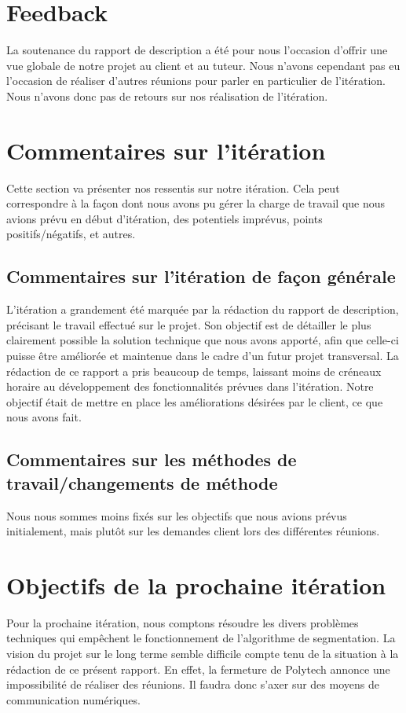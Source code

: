 \documentclass[12pt,titlepage,french]{article}
\begin{document}
\section{Feedback}

La soutenance du rapport de description a été pour nous l'occasion d'offrir une vue globale de notre projet au client et au tuteur.
Nous n'avons cependant pas eu l'occasion de réaliser d'autres réunions pour parler en particulier de l'itération. Nous n'avons donc pas de retours sur nos réalisation de l'itération.

\section{Commentaires sur l'itération}

Cette section va présenter nos ressentis sur notre itération. Cela peut correspondre à la façon dont nous avons pu gérer la charge de travail que nous avions prévu en début d'itération, des potentiels imprévus, points positifs/négatifs, et autres.

\subsection{Commentaires sur l'itération de façon générale}

L'itération a grandement été marquée par la rédaction du rapport de description, précisant le travail effectué sur le projet. Son objectif est de détailler le plus clairement possible la solution technique que nous avons apporté, afin que celle-ci puisse être améliorée et maintenue dans le cadre d'un futur projet transversal.
La rédaction de ce rapport a pris beaucoup de temps, laissant moins de créneaux horaire au développement des fonctionnalités prévues dans l'itération.
Notre objectif était de mettre en place les améliorations désirées par le client, ce que nous avons fait.

\subsection{Commentaires sur les méthodes de travail/changements de méthode}

Nous nous sommes moins fixés sur les objectifs que nous avions prévus initialement, mais plutôt sur les demandes client lors des différentes réunions.
\section{Objectifs de la prochaine itération}
Pour la prochaine itération, nous comptons résoudre les divers problèmes techniques qui empêchent le fonctionnement de l'algorithme de segmentation.
La vision du projet sur le long terme semble difficile compte tenu de la situation à la rédaction de ce présent rapport. En effet, la fermeture de Polytech annonce une impossibilité de réaliser des réunions.
Il faudra donc s'axer sur des moyens de communication numériques.
\end{document}
